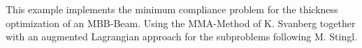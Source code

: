 This example implements the minimum compliance problem for the thickness optimization 
of an MBB-Beam. Using the MMA-Method of K. Svanberg together with an augmented Lagrangian 
approach for the subproblems following M. Stingl.